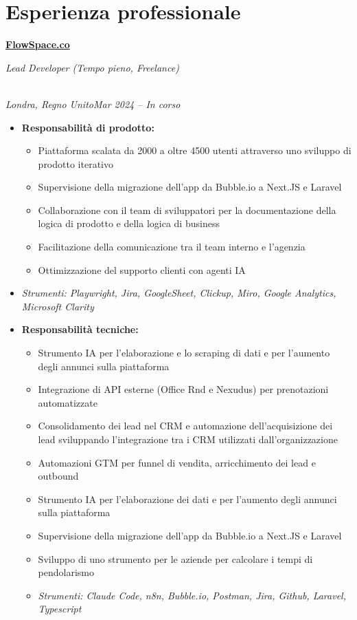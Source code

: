 \documentclass[a4paper,10pt]{article}
\newcommand{\role}[4]{\vspace{3pt}\noindent\hspace{0.6em}\parbox[t]{0.38\textwidth}{\raggedright\textbf{#1}}\hfill\parbox[t]{0.58\textwidth}{\raggedleft\textit{#2}}\\{\textit{#3}\hfill\textit{#4}}\vspace{1pt}}
\begin{document}
\section{Esperienza professionale}
\role{\href{https://flowspace.co}{FlowSpace.co}}{Lead Developer (Tempo pieno, Freelance)}{Londra, Regno Unito}{Mar 2024 -- In corso}
\begin{itemize}
\item \textbf{Responsabilit\`a di prodotto:}
\begin{itemize}[label=--]
\item Piattaforma scalata da 2000 a oltre 4500 utenti attraverso uno sviluppo di prodotto iterativo
\item Supervisione della migrazione dell'app da Bubble.io a Next.JS e Laravel
\item Collaborazione con il team di sviluppatori per la documentazione della logica di prodotto e della logica di business
\item Facilitazione della comunicazione tra il team interno e l'agenzia
\item Ottimizzazione del supporto clienti con agenti IA
\end{itemize}
\item \textit{Strumenti: Playwright, Jira, GoogleSheet, Clickup, Miro, Google Analytics, Microsoft Clarity}
\item \textbf{Responsabilit\`a tecniche:}
\begin{itemize}[label=--]
\item Strumento IA per l'elaborazione e lo scraping di dati e per l'aumento degli annunci sulla piattaforma
\item Integrazione di API esterne (Office Rnd e Nexudus) per prenotazioni automatizzate
\item Consolidamento dei lead nel CRM e automazione dell'acquisizione dei lead sviluppando l'integrazione tra i CRM utilizzati dall'organizzazione
\item Automazioni GTM per funnel di vendita, arricchimento dei lead e outbound
\item Strumento IA per l'elaborazione dei dati e per l'aumento degli annunci sulla piattaforma
\item Supervisione della migrazione dell'app da Bubble.io a Next.JS e Laravel
\item Sviluppo di uno strumento per le aziende per calcolare i tempi di pendolarismo
\item \textit{Strumenti: Claude Code, n8n, Bubble.io, Postman, Jira, Github, Laravel, Typescript}
\end{itemize}
\end{itemize}
\end{document}
